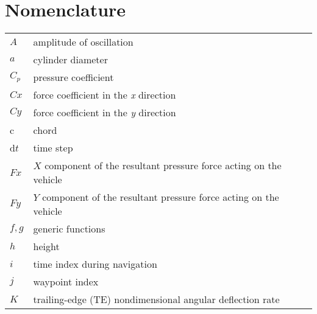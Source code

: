 \section{Nomenclature}

 {\renewcommand\arraystretch{1.0}
  \noindent\begin{longtable*}{@{}l @{\quad=\quad} l@{}}
	  $A$  & amplitude of oscillation \\
	  $a$ &    cylinder diameter \\
	  $C_p$& pressure coefficient \\
	  $Cx$ & force coefficient in the \textit{x} direction \\
	  $Cy$ & force coefficient in the \textit{y} direction \\
	  c   & chord \\
	  d$t$ & time step \\
	  $Fx$ & $X$ component of the resultant pressure force acting on the vehicle \\
	  $Fy$ & $Y$ component of the resultant pressure force acting on the vehicle \\
	  $f, g$   & generic functions \\
	  $h$  & height \\
	  $i$  & time index during navigation \\
	  $j$  & waypoint index \\
	  $K$  & trailing-edge (TE) nondimensional angular deflection rate
  \end{longtable*}}

